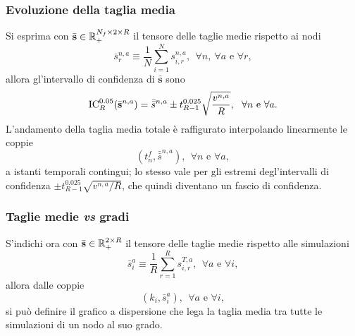             \subsubsection{Evoluzione della taglia media}

                Si esprima con \(\bar{\mathbf s}\in\mathbb R_+^{N_f\times2\times R}\) il tensore delle taglie medie rispetto ai nodi
                \begin{equation*}
                    \bar s^{n,a}_r\equiv
                    \frac1N\sum_{i=1}^Ns^{n,a}_{i,r}
                    ,\ \ \forall n,\ \forall a\text{ e }\forall r,
                \end{equation*}
                allora gl'intervallo di confidenza di \(\bar{\mathbf s}\) sono
                \begin{equation*}
                    \operatorname{IC}_R^{0.05}(\bar{\mathbf s}^{n,a})=
                    \bar{\bar s}^{n,a}\pm t^{0.025}_{R-1}\sqrt{\frac{v^{n,a}}R},
                    \ \ \forall n\text{ e }\forall a.
                \end{equation*}
                L'andamento della taglia media totale è raffigurato interpolando linearmente le coppie
                \begin{equation*}
                    \left(t^f_n,\bar{\bar s}^{n,a}\right),
                    \ \ \forall n\text{ e }\forall a,
                \end{equation*}
                a istanti temporali contingui; lo stesso vale per gli estremi degl'intervalli di confidenza \(\pm t^{0.025}_{R-1}\sqrt{v^{n,a}/R}\), che quindi diventano un fascio di confidenza.
        
            \subsubsection{Taglie medie \textit{vs} gradi}
            
                S'indichi ora con \(\bar{\mathbf s}\in\mathbb R_+^{2\times R}\) il tensore delle taglie medie rispetto alle simulazioni
                \begin{equation*}
                    \bar s^a_i\equiv
                    \frac1R\sum_{r=1}^Rs^{T,a}_{i,r}
                    ,\ \ \forall a\text{ e }\forall i,
                \end{equation*}
                allora dalle coppie
                \begin{equation*}
                    \left(k_i,\bar s^a_i\right),
                    \ \ \forall a\text{ e }\forall i,
                \end{equation*}
                si può definire il grafico a dispersione che lega la taglia media tra tutte le simulazioni di un nodo al suo grado.

